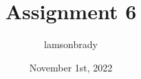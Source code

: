 \usepackage[utf8]{inputenc}

\title{Assignment 6}
\author{lamsonbrady}
\date{November 1st, 2022}

\usepackage{parskip}
\usepackage[makeroom]{cancel}
\usepackage{graphicx}

\usepackage{fancyhdr}
\pagestyle{fancy}

\usepackage{amsmath}
\usepackage{amssymb}

\newcommand{\psmall}[1]{
	\left(\begin{smallmatrix}
		#1
	\end{smallmatrix} \right)
}

\newcommand{\genpmat}[1]{
	\ensuremath{
		\begin{pmatrix}
			#1
		\end{pmatrix}
	}
}
\newcommand{\genericmat}[2]{
	\ensuremath{
		\begin{#1matrix}
			#2
		\end{#1matrix}
	}
}

\newcommand{\genericvec}{
	\ensuremath{
		\left\{\vec{e_1}, \vec{e_2}, \dots, \vec{e_n} \right\}
	}
}

\newcommand{\bb}{\mathbb}
\newcommand{\R}{\mathbb{R}}
\renewcommand{\P}{\mathbb{P}}
\newcommand{\Z}{\mathbb{Z}}

\newcommand*{\myprime}{^{\prime}\mkern-1.2mu}
\newcommand*{\mydprime}{^{\prime\prime}\mkern-1.2mu}
\newcommand*{\mytrprime}{^{\prime\prime\prime}\mkern-1.2mu}

